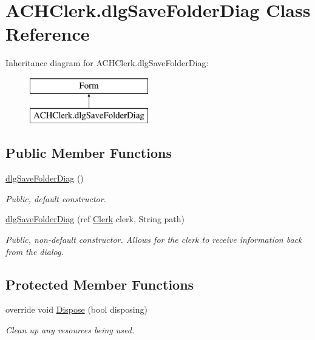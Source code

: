 \hypertarget{class_a_c_h_clerk_1_1dlg_save_folder_diag}{\section{A\+C\+H\+Clerk.\+dlg\+Save\+Folder\+Diag Class Reference}
\label{class_a_c_h_clerk_1_1dlg_save_folder_diag}
}
Inheritance diagram for A\+C\+H\+Clerk.\+dlg\+Save\+Folder\+Diag\+:\begin{figure}[H]
\begin{center}
\leavevmode
\includegraphics[height=2.000000cm]{class_a_c_h_clerk_1_1dlg_save_folder_diag}
\end{center}
\end{figure}
\subsection*{Public Member Functions}
\begin{DoxyCompactItemize}
\item 
\hyperlink{class_a_c_h_clerk_1_1dlg_save_folder_diag_ab1756da02d4d179151f710f1e36e9edc}{dlg\+Save\+Folder\+Diag} ()
\begin{DoxyCompactList}\small\item\em Public, default constructor. \end{DoxyCompactList}\item 
\hyperlink{class_a_c_h_clerk_1_1dlg_save_folder_diag_a7398a9b24c8813f4ff91d7868f0bf180}{dlg\+Save\+Folder\+Diag} (ref \hyperlink{class_a_c_h_clerk_1_1_clerk}{Clerk} clerk, String path)
\begin{DoxyCompactList}\small\item\em Public, non-\/default constructor. Allows for the clerk to receive information back from the dialog. \end{DoxyCompactList}\end{DoxyCompactItemize}
\subsection*{Protected Member Functions}
\begin{DoxyCompactItemize}
\item 
override void \hyperlink{class_a_c_h_clerk_1_1dlg_save_folder_diag_ad72fba8b0b331fceac2db6c0a016cd50}{Dispose} (bool disposing)
\begin{DoxyCompactList}\small\item\em Clean up any resources being used. \end{DoxyCompactList}\end{DoxyCompactItemize}
